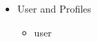 \documentclass[a4paper, 14pt]{extarticle}
\begin{document}
\begin{itemize}
  \item User and Profiles
    \begin{itemize}
      \item user

\end{itemize}
\end{itemize}
\end{document}
